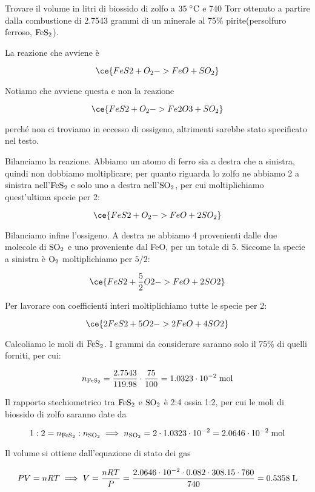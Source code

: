 \newpage

\begin{esercizio}
    Trovare il volume in litri di biossido di zolfo a $35 \; ^{\circ} \rm C$ e 740 Torr ottenuto a partire dalla combustione di 2.7543 grammi di un minerale al 75\% pirite\footnotemark\;(persolfuro ferroso, $\rm FeS_2$).
\end{esercizio}
\begin{soluzione}
    La reazione che avviene è

$$\ce{FeS2 + O_2 -> FeO + SO_2}$$

Notiamo che avviene questa e non la reazione

$$\ce{FeS2 + O_2 -> Fe2O3 + SO_2}$$

perché non ci troviamo in eccesso di ossigeno, altrimenti sarebbe stato specificato nel testo.

Bilanciamo la reazione. Abbiamo un atomo di ferro sia a destra che a sinistra, quindi non dobbiamo moltiplicare; per quanto riguarda lo zolfo ne abbiamo 2 a sinistra nell'$\rm FeS_2$ e solo uno a destra nell'$\rm SO_2$, per cui moltiplichiamo quest'ultima specie per 2:

$$\ce{FeS2 + O_2 -> FeO + 2SO_2}$$

Bilanciamo infine l'ossigeno. A destra ne abbiamo 4 provenienti dalle due molecole di $\rm SO_2$ e uno proveniente dal FeO, per un totale di 5. Siccome la specie a sinistra è $\rm O_2$ moltiplichiamo per $5/2$:

$$\ce{FeS2 + \frac{5}{2}O2 -> FeO + 2SO2}$$

Per lavorare con coefficienti interi moltiplichiamo tutte le specie per 2:

$$\ce{2FeS2 + 5O2 -> 2FeO + 4SO2}$$

Calcoliamo le moli di $\rm FeS_2$. I grammi da considerare saranno solo il 75\% di quelli forniti, per cui:

$$n_{\rm FeS_2}=\frac{2.7543}{119.98} \cdot \frac{75}{100}
=1.0323 \cdot 10^{-2} \; \rm mol$$

Il rapporto stechiometrico tra $\rm FeS_2$ e $\rm SO_2$ è 2:4 ossia 1:2, per cui le moli di biossido di zolfo saranno date da

$$1:2=n_{\rm FeS_2}:n_{\rm SO_2}
\implies
n_{\rm SO_2}=2 \cdot 1.0323 \cdot 10^{-2}
=2.0646 \cdot 10^{-2} \; \rm mol$$

Il volume si ottiene dall'equazione di stato dei gas

$$PV=nRT
\implies
V=\frac{nRT}{P}=\frac{2.0646 \cdot 10^{-2} \cdot 0.082 \cdot 308.15 \cdot 760}{740}=0.5358 \; \rm L$$

\end{soluzione}

